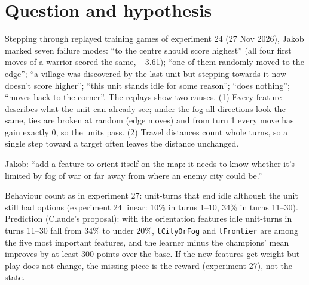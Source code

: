 \documentclass{../polyexp}
\begin{document}

\ExpHeader

\section{Question and hypothesis}
Stepping through replayed training games of experiment 24 (27 Nov 2026), Jakob marked seven failure modes:
``to the centre should score highest'' (all four first moves of a warrior scored the same, +3.61);
``one of them randomly moved to the edge'';
``a village was discovered by the last unit but stepping towards it now doesn't score higher'';
``this unit stands idle for some reason''; ``does nothing''; ``moves back to the corner''.
The replays show two causes. (1) Every feature describes what the unit can already see; under the fog all directions
look the same, ties are broken at random (edge moves) and from turn 1 every move has gain exactly 0, so the units pass.
(2) Travel distances count whole turns, so a single step toward a target often leaves the distance unchanged.

Jakob: ``add a feature to orient itself on the map: it needs to know whether it's limited by fog of war or far away
from where an enemy city could be.''

Behaviour count as in experiment 27: unit-turns that end idle although the unit still had options (experiment 24
linear: 10\% in turns 1--10, 34\% in turns 11--30).
Prediction (Claude's proposal): with the orientation features idle unit-turns in turns 11--30 fall from 34\% to under
20\%, \texttt{tCityOrFog} and \texttt{tFrontier} are among the five most important
features, and the learner minus the champions' mean improves by at least 300 points over the base. If the new
features get weight but play does not change, the missing piece is the reward (experiment 27), not the state.
\end{document}
